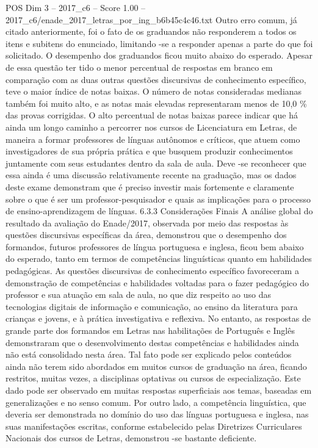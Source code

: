 \begin{textsample}{POS Dim 3 – 2017\_c6 – Score 1.00 – 2017\_c6/enade\_2017\_letras\_por\_ing\_b6b45c4c46.txt}
Outro erro comum, já citado anteriormente, foi o fato de os graduandos não responderem a todos os itens e subitens do enunciado, limitando -se a responder apenas a parte do que foi solicitado.
O desempenho dos graduandos ficou muito abaixo do esperado.
Apesar de essa questão ter tido o menor percentual de respostas em branco em comparação com as duas outras questões discursivas de conhecimento específico, teve o maior índice de notas baixas.
O número de notas consideradas medianas também foi muito alto, e as notas mais elevadas representaram menos de 10,0 \% das provas corrigidas.
O alto percentual de notas baixas parece indicar que há ainda um longo caminho a percorrer nos cursos de Licenciatura em Letras, de maneira a formar professores de línguas autônomos e críticos, que atuem como investigadores de sua própria prática e que busquem produzir conhecimentos juntamente com seus estudantes dentro da sala de aula.
Deve -se reconhecer que essa ainda é uma discussão relativamente recente na graduação, mas os dados deste exame demonstram que é preciso investir mais fortemente e claramente sobre o que é ser um professor-pesquisador e quais as implicações para o processo de ensino-aprendizagem de línguas. 6.3.3 Considerações Finais A análise global do resultado da avaliação do Enade/2017, observada por meio das respostas às questões discursivas específicas da área, demonstrou que o desempenho dos formandos, futuros professores de língua portuguesa e inglesa, ficou bem abaixo do esperado, tanto em termos de competências linguísticas quanto em habilidades pedagógicas.
As questões discursivas de conhecimento específico favoreceram a demonstração de competências e habilidades voltadas para o fazer pedagógico do professor e sua atuação em sala de aula, no que diz respeito ao uso das tecnologias digitais de informação e comunicação, ao ensino da literatura para crianças e jovens, e à prática investigativa e reflexiva.
No entanto, as respostas de grande parte dos formandos em Letras nas habilitações de Português e Inglês demonstraram que o desenvolvimento destas competências e habilidades ainda não está consolidado nesta área.
Tal fato pode ser explicado pelos conteúdos ainda não terem sido abordados em muitos cursos de graduação na área, ficando restritos, muitas vezes, a disciplinas optativas ou cursos de especialização.
Este dado pode ser observado em muitas respostas superficiais aos temas, baseadas em generalizações e no senso comum.
Por outro lado, a competência linguística, que deveria ser demonstrada no domínio do uso das línguas portuguesa e inglesa, nas suas manifestações escritas, conforme estabelecido pelas Diretrizes Curriculares Nacionais dos cursos de Letras, demonstrou -se bastante deficiente.

\end{textsample}
